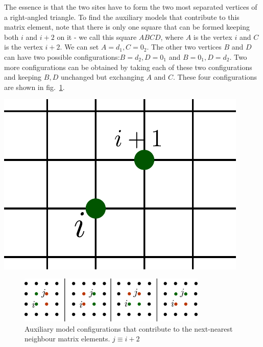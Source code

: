 \documentclass[10pt]{report}
\numberwithin{equation}{section}
\begin{document}
\par\noindent
\begin{minipage}{0.6\textwidth}
The essence is that the two sites have to form the two most separated vertices of a right-angled triangle. To find the auxiliary models that contribute to this matrix element, note that there is only one square that can be formed keeping both \(i\) and \(i+2\) on it - we call this square \(ABCD\), where \(A\) is the vertex \(i\) and \(C\) is the vertex \(i+2\). We can set \(A=d_1, C=0_2\). The other two vertices \(B\) and \(D\) can have two possible configurations:\(B=d_2,D=0_1\) and \(B=0_1,D=d_2\). Two more configurations can be obtained by taking each of these two configurations and keeping \(B,D\) unchanged but exchanging \(A\) and \(C\). These four configurations are shown in fig.~\ref{nn-configs}. 
\end{minipage}
\hspace*{\fill}
\begin{minipage}{0.35\textwidth}
	\centering
	\includegraphics[width=0.9\textwidth]{../figures/next-near.pdf}
	\label{next-near}
\end{minipage}

\begin{figure}[htpb]
	\centering
	\includegraphics[width=0.8\textwidth]{../figures/nn-offdiagonal_contributors.pdf}
	\caption{Auxiliary model configurations that contribute to the next-nearest neighbour matrix elements. \(j \equiv i+2\)}
	\label{nn-configs}
\end{figure}
\end{document}
